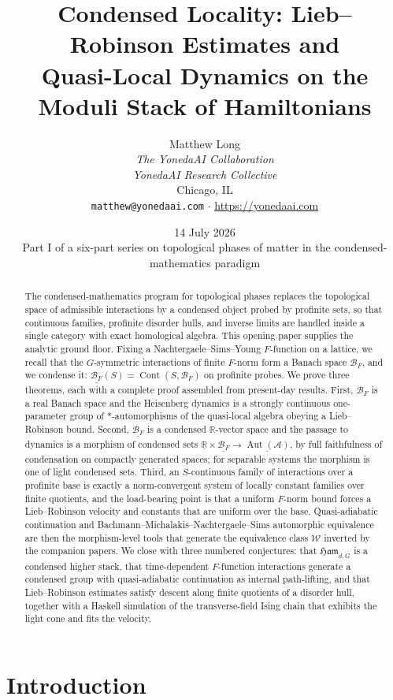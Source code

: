 \documentclass[12pt]{article}
\title{\bfseries Condensed Locality: Lieb--Robinson Estimates and\\
Quasi-Local Dynamics on the Moduli Stack of Hamiltonians}
\author{Matthew Long \\
\textit{The YonedaAI Collaboration} \\
\textit{YonedaAI Research Collective} \\
Chicago, IL \\
\texttt{matthew@yonedaai.com} $\cdot$ \url{https://yonedaai.com}}
\date{14 July 2026\\[4pt]\small Part I of a six-part series on topological phases of matter in the condensed-mathematics paradigm}
\newcommand{\cond}[1]{\underline{#1}}          %
\newcommand{\Cont}{\operatorname{Cont}}        %
\newcommand{\Ffun}{F}                          %
\newcommand{\BF}{\mathcal{B}_{F}}              %
\newcommand{\Ham}{\mathfrak{Ham}}              %
\newcommand{\Weq}{\mathcal{W}}                 %
\newcommand{\qA}{\mathcal{A}}
\newcommand{\Aut}{\operatorname{Aut}}
\newcommand{\R}{\mathbb{R}}
\theoremstyle{definition}
\theoremstyle{remark}
\begin{document}
\maketitle

\begin{abstract}
The condensed-mathematics program for topological phases replaces the topological space of
admissible interactions by a condensed object probed by profinite sets, so that continuous
families, profinite disorder hulls, and inverse limits are handled inside a single category
with exact homological algebra. This opening paper supplies the analytic ground floor. Fixing
a Nachtergaele--Sims--Young $\Ffun$-function on a lattice, we recall that the $G$-symmetric
interactions of finite $\Ffun$-norm form a Banach space $\BF$, and we condense it:
$\cond{\BF}(S)=\Cont(S,\BF)$ on profinite probes. We prove three theorems, each with a
complete proof assembled from present-day results. First, $\BF$ is a real Banach space and
the Heisenberg dynamics is a strongly continuous one-parameter group of $*$-automorphisms of
the quasi-local algebra obeying a Lieb--Robinson bound. Second, $\cond{\BF}$ is a condensed
$\R$-vector space and the passage to dynamics is a morphism of condensed sets
$\cond{\R}\times\cond{\BF}\to\cond{\Aut(\qA)}$, by full faithfulness of condensation on
compactly generated spaces; for separable systems the morphism is one of light condensed
sets. Third, an $S$-continuous family of interactions over a profinite base is exactly a
norm-convergent system of locally constant families over finite quotients, and the
load-bearing point is that a uniform $\Ffun$-norm bound forces a Lieb--Robinson velocity and
constants that are uniform over the base. Quasi-adiabatic continuation and
Bachmann--Michalakis--Nachtergaele--Sims automorphic equivalence are then the morphism-level
tools that generate the equivalence class $\Weq$ inverted by the companion papers. We close
with three numbered conjectures: that $\Ham_{d,G}$ is a condensed higher stack, that
time-dependent $\Ffun$-function interactions generate a condensed group with quasi-adiabatic
continuation as internal path-lifting, and that Lieb--Robinson estimates satisfy descent
along finite quotients of a disorder hull, together with a Haskell simulation of the
transverse-field Ising chain that exhibits the light cone and fits the velocity.
\end{abstract}

\tableofcontents

\section{Introduction}
\label{sec:intro}
\end{document}
